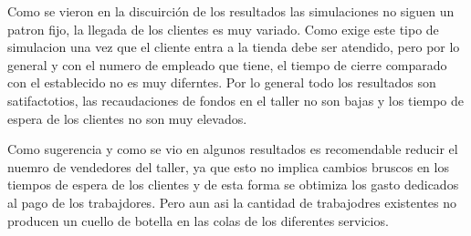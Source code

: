 \documentclass[12pt]{article}
\begin{document}
Como se vieron en la discuirci\'on de los resultados las simulaciones no siguen un patron fijo, la llegada de los clientes es muy variado. Como exige este tipo de simulacion una vez que el cliente entra a la tienda debe ser atendido, pero por lo general y con el numero de empleado que tiene, el tiempo de cierre comparado con el establecido no es muy diferntes. Por lo general todo los resultados son satifactotios, las recaudaciones de fondos en el taller no son bajas y los tiempo de espera de los clientes no son muy elevados.

Como sugerencia y como se vio en algunos resultados es recomendable reducir el nuemro de vendedores del taller, ya que esto no implica cambios bruscos en los tiempos de espera de los clientes y de esta forma se obtimiza los gasto dedicados al pago de los trabajdores. Pero aun asi la cantidad de trabajodres existentes no producen un cuello de botella en las colas de los diferentes servicios.
 
\end{document}
